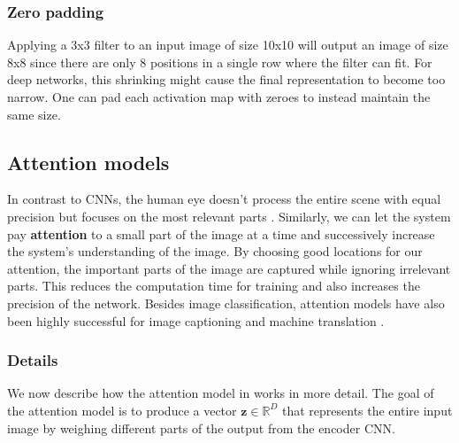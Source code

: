 \subsubsection{Zero padding}

Applying a 3x3 filter to an input image of size 10x10 will output an image of size 8x8 since there are only 8 positions in a single row where the filter can fit. For deep networks, this shrinking might cause the final representation to become too narrow.
One can pad each activation map with zeroes to instead maintain the same size.

\subsection{Attention models}
\label{ssec:attention}


In contrast to CNNs, the human eye doesn't process the entire scene with equal precision but focuses on the most relevant parts \cite{DeepMindAttention}.
Similarly, we can let the system pay \textbf{attention} to a small part of the image at a time and successively increase the system's understanding of the image.
By choosing good locations for our attention, the important parts of the image are captured while ignoring irrelevant parts.
This reduces the computation time for training and also increases the precision of the network.
Besides image classification, attention models have also been highly successful for image captioning \cite{AttendAndTell} and machine translation \cite{machine_translation_attention}.

\subsubsection{Details}
We now describe how the attention model in \cite{AttendAndTell} works in more detail.
The goal of the attention model is to produce a vector $\mathbf{z} \in \mathbb{R}^D$ that represents the entire input image by weighing different parts of the output from the encoder CNN.

